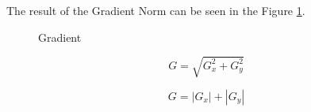 \documentclass{article}
\begin{document}
The result of the Gradient Norm can be seen in the Figure \ref{fig:norm_gradient}. 

\begin{figure}[H]
	\centering
	\caption{Gradient}
	\label{fig:norm_gradient}
\end{figure}


\begin{equation}
G = \sqrt{G_x^{2}+G_y^{2}}
\label{equa:norm1}
\end{equation}

\begin{equation}
G = | G_x | + | G_y |
\label{equa:norm2}
\end{equation}
\end{document}
